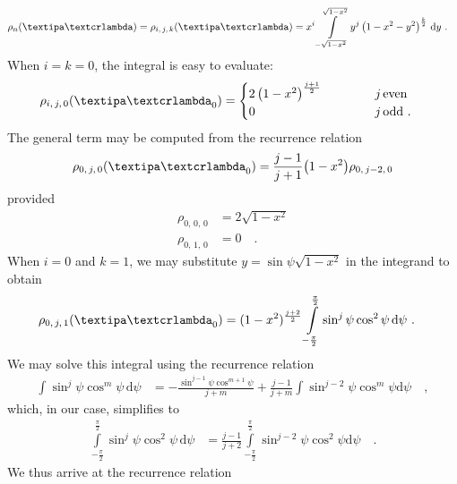 \documentclass[modern]{aastex631}
\begin{document}
%
\begin{align}
    \label{eq:kT:sTexpression}
    \rho_n(\lnlam)
     & =
    \rho_{i,\,j,\,k}(\lnlam)
    =
    x^i
    \int\limits_{-\sqrt{1 - x^2}}^
    {\sqrt{1 - x^2}}
    y^j
    \left(1 - x^2 - y^2\right)^{\frac{k}{2}} \,
    \mathrm{d}y
    \quad .
\end{align}
%
When $i = k = 0$, the integral is easy to evaluate:
%
\begin{align}
    \rho_{i,\,j,\,0}(\lnlam_0)
     & =
    \begin{cases}
        2 \left( 1 - x^2 \right)^\frac{j + 1}{2}
        \quad\quad\quad\quad\quad\quad\quad\quad\quad\quad\quad\quad
          & j \, \mathrm{even}        \\
        0 & j \, \mathrm{odd} \quad .
    \end{cases}
\end{align}
%
The general term may be computed from the recurrence relation
%
\begin{align}
    \rho_{0,\,j,\,0}(\lnlam_0) = \frac{j - 1}{j + 1} \big(1 - x^2\big) \rho_{0,\,j-2,\,0}
\end{align}
%
provided
%
\begin{align}
    \rho_{0,\,0,\,0} & = 2 \sqrt{1-x^2} \nonumber \\
    \rho_{0,\,1,\,0} & = 0 \quad.
\end{align}
%
When $i = 0$ and $k = 1$, we may substitute $y = \sin\psi\sqrt{1 - x^2}$ in the integrand to obtain
%
\begin{align}
    \rho_{0,\,j,\,1}(\lnlam_0)
     & =
    (1 - x^2)^{\frac{j + 2}{2}}
    \int\limits_{-\frac{\pi}{2}}^{\frac{\pi}{2}}
    \sin^j\psi
    \cos^2\psi \,
    \mathrm{d}\psi
    \quad.
\end{align}
%
We may solve this integral using the recurrence relation
%
\begin{align}
    \int
    \sin^j\psi
    \cos^m\psi \,
    \mathrm{d}\psi
     & =
    -\frac{\sin^{j-1}\psi \cos^{m+1}\psi}{j + m}
    +
    \frac{j - 1}{j + m}\int\sin^{j-2}\psi \cos^m\psi \mathrm{d}\psi
    \quad ,
\end{align}
%
which, in our case, simplifies to
%
\begin{align}
    \int\limits_{-\frac{\pi}{2}}^{\frac{\pi}{2}}
    \sin^j\psi
    \cos^2\psi \,
    \mathrm{d}\psi
     & =
    \frac{j - 1}{j + 2}\int\limits_{-\frac{\pi}{2}}^
    {\frac{\pi}{2}}\sin^{j-2}\psi \cos^2\psi \mathrm{d}\psi
    \quad.
\end{align}
%
We thus arrive at the recurrence relation
%
\end{document}
